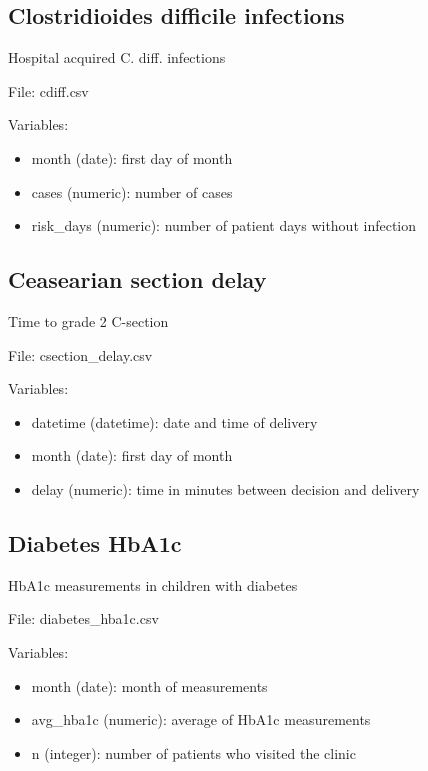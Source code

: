 \documentclass[
]{book}
\providecommand{\tightlist}{%
  \setlength{\itemsep}{0pt}\setlength{\parskip}{0pt}}
\begin{document}
\subsection*{Clostridioides difficile infections}\label{clostridioides-difficile-infections}

Hospital acquired C. diff. infections

File: cdiff.csv

Variables:

\begin{itemize}
\tightlist
\item
  month (date): first day of month
\item
  cases (numeric): number of cases
\item
  risk\_days (numeric): number of patient days without infection
\end{itemize}

\subsection*{Ceasearian section delay}\label{ceasearian-section-delay}

Time to grade 2 C-section

File: csection\_delay.csv

Variables:

\begin{itemize}
\tightlist
\item
  datetime (datetime): date and time of delivery
\item
  month (date): first day of month
\item
  delay (numeric): time in minutes between decision and delivery
\end{itemize}

\subsection*{Diabetes HbA1c}\label{diabetes-hba1c}

HbA1c measurements in children with diabetes

File: diabetes\_hba1c.csv

Variables:

\begin{itemize}
\tightlist
\item
  month (date): month of measurements
\item
  avg\_hba1c (numeric): average of HbA1c measurements
\item
  n (integer): number of patients who visited the clinic
\end{itemize}
\end{document}
